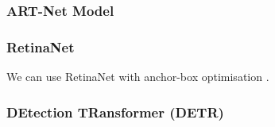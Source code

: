\subsubsection{ART-Net Model}


\subsubsection{RetinaNet}


We can use RetinaNet with anchor-box optimisation \cite{zlocha2019improving}.


\subsubsection{DEtection TRansformer (DETR)}

